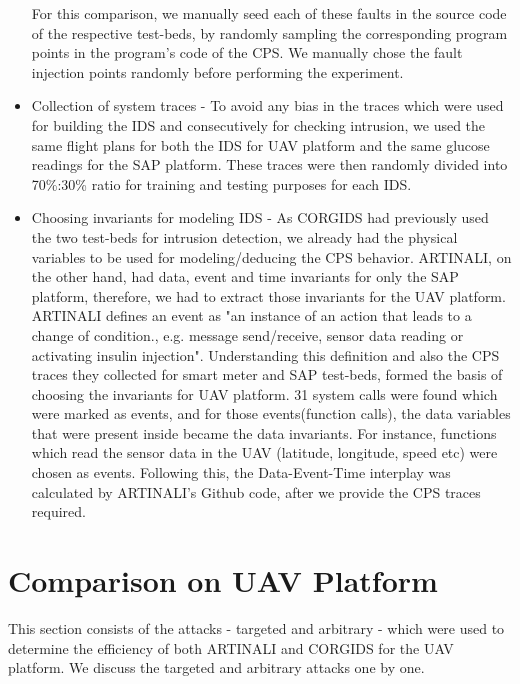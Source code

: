 \begin{itemize}
For this comparison, we manually seed each of these faults in the source code of the respective test-beds, by randomly sampling the corresponding program points in the program’s code of the \ac{CPS}. We manually chose the fault injection points randomly before performing the experiment.

\item Collection of system traces - To avoid any bias in the traces which were used for building the \ac{IDS} and consecutively for checking intrusion, we used the same flight plans for both the \ac{IDS} for \ac{UAV} platform and the same glucose readings for the \ac{SAP} platform. These traces were then randomly divided into 70\%:30\% ratio for training and testing purposes for each \ac{IDS}.

\item Choosing invariants for modeling \ac{IDS} - As \ac{CORGIDS} had previously used the two test-beds for intrusion detection, we already had the physical variables to be used for modeling/deducing the \ac{CPS} behavior. ARTINALI, on the other hand, had data, event and time invariants for only the \ac{SAP} platform, therefore, we had to extract those invariants for the \ac{UAV} platform. ARTINALI defines an event as "an instance of an action that leads to a change of condition., e.g. message send/receive, sensor data reading or activating insulin injection". Understanding this definition and also the \ac{CPS} traces they collected for smart meter and \ac{SAP} test-beds, formed the basis of choosing the invariants for \ac{UAV} platform. 31 system calls were found which were marked as events, and for those events(function calls), the data variables that were present inside became the data invariants. For instance, functions which read the sensor data in the \ac{UAV} (latitude, longitude, speed etc) were chosen as events. Following this, the Data-Event-Time interplay was calculated by ARTINALI's Github code\cite{ARTINALI}, after we provide the \ac{CPS} traces required.
\end{itemize}

\section{Comparison on \ac{UAV} Platform}
This section consists of the attacks - targeted and arbitrary - which were used to determine the efficiency of both ARTINALI and \ac{CORGIDS} for the \ac{UAV} platform. We discuss the targeted and arbitrary attacks one by one.


